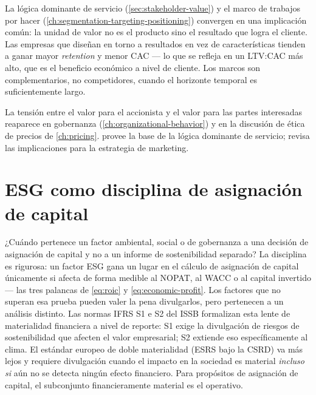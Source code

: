 La lógica dominante de servicio (\cref{sec:stakeholder-value}) y el marco de trabajos por hacer
(\cref{ch:segmentation-targeting-positioning}) convergen en una implicación común: la unidad de
valor no es el producto sino el resultado que logra el cliente. Las empresas que diseñan en torno
a resultados en vez de características tienden a ganar mayor \emph{retention} y menor CAC ---
lo que se refleja en un LTV:CAC más alto, que es el beneficio económico a nivel de cliente. Los
marcos son complementarios, no competidores, cuando el horizonte temporal es suficientemente largo.

La tensión entre el valor para el accionista y el valor para las partes interesadas reaparece en
gobernanza (\cref{ch:organizational-behavior}) y en la discusión de ética de precios de
\cref{ch:pricing}. \textcite{vargo2004service} provee la base de la lógica dominante de servicio;
\textcite{kotler2021} revisa las implicaciones para la estrategia de marketing.

\section{ESG como disciplina de asignación de capital}\label{sec:esg-capital}

¿Cuándo pertenece un factor ambiental, social o de gobernanza a una decisión de asignación de
capital y no a un informe de sostenibilidad separado? La disciplina es rigurosa: un factor ESG
gana un lugar en el cálculo de asignación de capital únicamente si afecta de forma medible al
NOPAT, al WACC o al capital invertido --- las tres palancas de \cref{eq:roic} y
\cref{eq:economic-profit}. Los factores que no superan esa prueba pueden valer la pena divulgarlos,
pero pertenecen a un análisis distinto. Las normas IFRS S1 e S2 del ISSB formalizan esta lente de
materialidad financiera a nivel de reporte: S1 exige la divulgación de riesgos de sostenibilidad
que afecten el valor empresarial; S2 extiende eso específicamente al clima. El estándar europeo
de doble materialidad (ESRS bajo la CSRD) va más lejos y requiere divulgación cuando el impacto
en la sociedad es material \emph{incluso si} aún no se detecta ningún efecto financiero. Para
propósitos de asignación de capital, el subconjunto financieramente material es el operativo.


